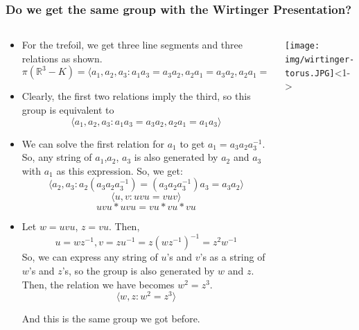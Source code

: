 \documentclass[8pt]{beamer}
\begin{document}
  \begin{frame}
    \frametitle{Do we get the same group with the Wirtinger Presentation?}
    \begin{columns}
      \begin{column}[T]{0.5\textwidth}
        \begin{itemize}
          \item<1-> For the trefoil, we get three line segments and three relations
            as shown.
            \[\pi(\mathbb{R}^3-K) = \langle a_1, a_2, a_3: a_1a_3 = a_3a_2, a_2a_1 = a_3a_2, a_2a_1 = a_1a_3\rangle \]
          \item<2->
            Clearly, the first two relations imply the third, so this group is equivalent to
            \[\langle a_1, a_2, a_3: a_1a_3 = a_3a_2, a_2a_1 = a_1a_3\rangle \]
          \item<3->We can solve the first relation for $a_1$ to get $a_1 =
            a_3a_2a_3^{-1}$. So, any string of $a_1$,$a_2$, $a_3$ is also
            generated by $a_2$ and $a_3$ with $a_1$ as this expression. So, we
            get:
            \[\langle a_2, a_3: a_2(a_3a_2a_3^{-1}) = (a_3a_2a_3^{-1})a_3 = a_3a_2\rangle \]
            \[\langle u, v: uvu = vuv\rangle \]
            \[uvu*uvu = vu*vu*vu\]
          \item<5-> Let $w = uvu$, $z = vu$. Then,
            \[u = wz^{-1}, v = zu^{-1} = z(wz^{-1})^{-1} = z^2w^{-1}\]
            So, we can express any string of $u$'s and $v$'s as a string of
            $w$'s and $z$'s, so the group is also generated by $w$ and $z$. Then,
            the relation we have becomes $w^2 = z^3$.
            \[\langle w, z : w^2 = z^3\rangle\]

            And this is the same group we got before.
        \end{itemize}
      \end{column}
      \begin{column}[T]{0.5\textwidth}
        \begin{center}
        \texttt{[image: img/wirtinger-torus.JPG]}<1->
        \end{center}
      \end{column}
    \end{columns}
  \end{frame}
\end{document}

